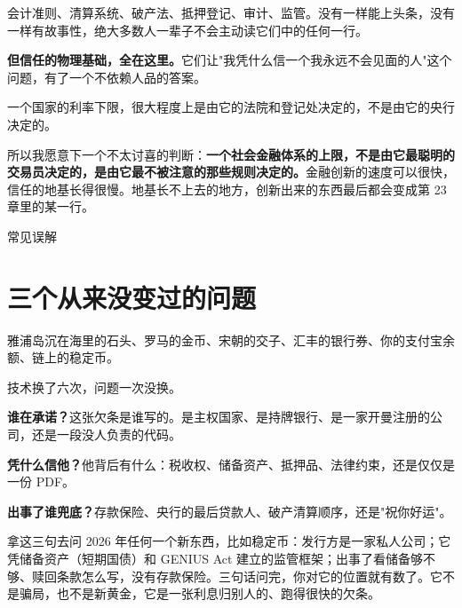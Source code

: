 会计准则、清算系统、破产法、抵押登记、审计、监管。没有一样能上头条，没有一样有故事性，绝大多数人一辈子不会主动读它们中的任何一行。

\textbf{但信任的物理基础，全在这里。}它们让"我凭什么信一个我永远不会见面的人"这个问题，有了一个不依赖人品的答案。

\begin{pullquote}{}
一个国家的利率下限，很大程度上是由它的法院和登记处决定的，不是由它的央行决定的。
\end{pullquote}

所以我愿意下一个不太讨喜的判断：\textbf{一个社会金融体系的上限，不是由它最聪明的交易员决定的，是由它最不被注意的那些规则决定的。}金融创新的速度可以很快，信任的地基长得很慢。地基长不上去的地方，创新出来的东西最后都会变成第 23 章里的某一行。

\begin{mythbox}{常见误解}
\end{mythbox}

\bookbreak

\section{三个从来没变过的问题}

雅浦岛沉在海里的石头、罗马的金币、宋朝的交子、汇丰的银行券、你的支付宝余额、链上的稳定币。

技术换了六次，问题一次没换。

\textbf{谁在承诺？}这张欠条是谁写的。是主权国家、是持牌银行、是一家开曼注册的公司，还是一段没人负责的代码。

\textbf{凭什么信他？}他背后有什么：税收权、储备资产、抵押品、法律约束，还是仅仅是一份 PDF。

\textbf{出事了谁兜底？}存款保险、央行的最后贷款人、破产清算顺序，还是"祝你好运"。

拿这三句去问 2026 年任何一个新东西，比如稳定币：发行方是一家私人公司；它凭储备资产（短期国债）和 GENIUS Act 建立的监管框架；出事了看储备够不够、赎回条款怎么写，没有存款保险。三句话问完，你对它的位置就有数了。它不是骗局，也不是新黄金，它是一张利息归别人的、跑得很快的欠条。

